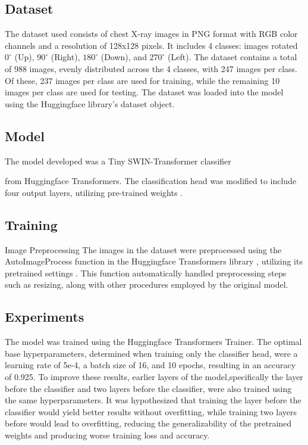 \documentclass[10pt,twocolumn,letterpaper]{article}
\begin{document}
{\subsection{Dataset}
The dataset used \cite{DatasetForClass} consists of chest X-ray images in PNG format with RGB color channels and a resolution of 128x128 pixels. It includes 4 classes: images rotated $0^{\circ}$ (Up), $90^{\circ}$ (Right), $180^{\circ}$ (Down), and $270^{\circ}$ (Left). The dataset contains a total of 988 images, evenly distributed across the 4 classes, with 247 images per class. Of these, 237 images per class are used for training, while the remaining 10 images per class are used for testing. The dataset was loaded into the model using the Huggingface library's dataset object\cite{huggingfacedataset}.

\subsection{Model}
The model developed was a Tiny SWIN-Transformer classifier \cite{DBLP:journals/corr/abs-2103-14030}} from Huggingface Transformers. The classification head was modified to include four output layers, utilizing pre-trained weights \cite{huggingface}.

\subsection{Training}
Image Preprocessing
The images in the dataset were preprocessed using the AutoImageProcess function in the Huggingface Transformers library \cite{huggingfaceproc}, utilizing its pretrained settings \cite{huggingface}. This function automatically handled preprocessing steps such as resizing, along with other procedures employed by the original model.

\subsection{Experiments}
The model was trained using the Huggingface Transformers Trainer\cite{huggingfacetrain}. The optimal base hyperparameters, determined when training only the classifier head, were a learning rate of 5e-4, a batch size of 16, and 10 epochs, resulting in an accuracy of 0.925. To improve these results, earlier layers of the model,specifically the layer before the classifier and two layers before the classifier, were also trained using the same hyperparameters. It was hypothesized that training the layer before the classifier would yield better results without overfitting, while training two layers before would lead to overfitting, reducing the generalizability of the pretrained weights and producing worse training loss and accuracy.
\end{document}
